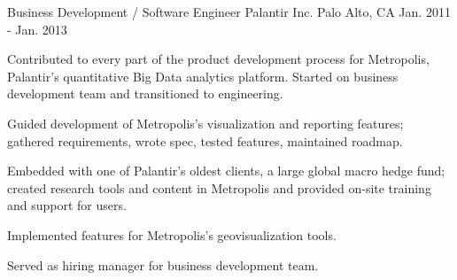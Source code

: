 \begin{cventries}
  \cventry
    {Business Development / Software Engineer} %
    {Palantir Inc.} %
    {Palo Alto, CA} %
    {Jan. 2011 - Jan. 2013} %
    {
      \begin{cvitems} %
        \item {Contributed to every part of the product development process for Metropolis, Palantir’s quantitative Big Data analytics platform. Started on business development team and transitioned to engineering.}
        \item {Guided development of Metropolis’s visualization and reporting features; gathered requirements, wrote spec, tested features, maintained roadmap.}
        \item {Embedded with one of Palantir's oldest clients, a large global macro hedge fund; created research tools and content in Metropolis and provided on-site training and support for users.}
        \item {Implemented features for Metropolis's geovisualization tools.}
        \item {Served as hiring manager for business development team.}
      \end{cvitems}
    }

\end{cventries}
